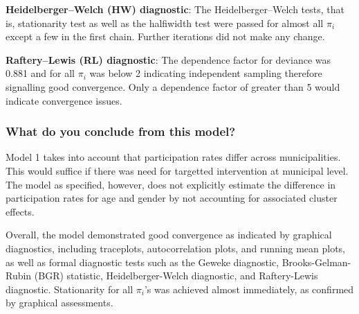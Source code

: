 \documentclass[12pt]{article}
\begin{document}
\textbf{Heidelberger–Welch (HW) diagnostic}: The Heidelberger–Welch tests, that is, stationarity test as well as the halfiwidth test were passed for almost all $\pi_i$ except a few in the first chain. Further iterations did not make any change.

\textbf{Raftery–Lewis (RL) diagnostic}: The dependence factor for deviance was 0.881 and for all $\pi_i$ was below 2 indicating independent sampling therefore signalling good convergence. Only a dependence factor of greater than 5 would indicate convergence issues.


\subsubsection{What do you conclude from this model?}


Model 1 takes into account that participation rates differ across municipalities. This would suffice if there was need for targetted intervention at municipal level. The model as specified, however, does not explicitly estimate the difference in participation rates for age and gender by not accounting for associated cluster effects. 

Overall, the model demonstrated good convergence as indicated by graphical diagnostics, including traceplots, autocorrelation plots, and running mean plots, as well as formal diagnostic tests such as the Geweke diagnostic, Brooks-Gelman-Rubin (BGR) statistic, Heidelberger-Welch diagnostic, and Raftery-Lewis diagnostic.  Stationarity for all  $\pi_i$'s was achieved almost immediately, as confirmed by graphical assessments.
\end{document}
